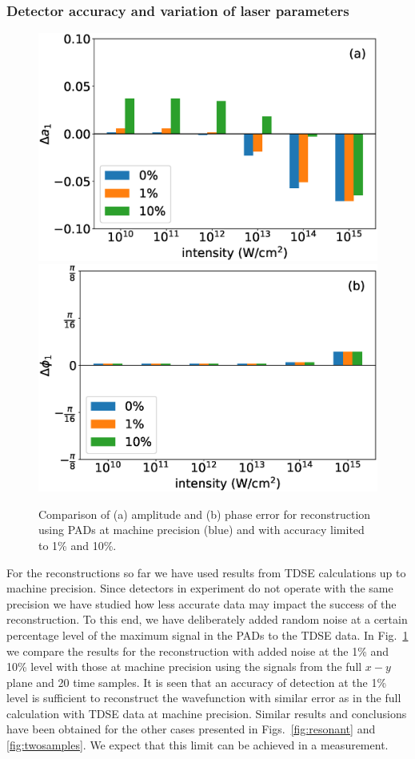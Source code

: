 \subsubsection{Detector accuracy and variation of laser parameters}

\begin{figure}[!ht]
\centering
\includegraphics[width=0.49\linewidth]{figs/Photo_ionization/superpositions/Venzke_new_fig_8a.eps}
\includegraphics[width=0.49\linewidth]{figs/Photo_ionization/superpositions/Venzke_new_fig_8b.eps}
\caption{
Comparison of (a) amplitude and (b) phase error for reconstruction using PADs at machine precision (blue) and with accuracy limited to 1\% and 10\%.
}
  \label{fig:detector}
\end{figure}

For the reconstructions so far
we have used results from TDSE calculations up to machine precision. Since detectors in experiment do not operate with the same precision we have studied how less accurate data may impact the success of the reconstruction. To this end, we have deliberately added random noise at a certain percentage level of the maximum signal in the PADs to the TDSE data. In Fig.\ \ref{fig:detector} we compare the results for the reconstruction with added noise at the  1\% and  10\% level with those at machine precision using the signals from the full $x-y$ plane and 20 time samples. It is seen that an accuracy of detection at the 1\% level is sufficient to reconstruct the wavefunction with similar error as in the full calculation with TDSE data at machine precision. Similar results and conclusions have been obtained for the other cases presented in Figs.\ \ref{fig:resonant} and \ref{fig:twosamples}. We expect that this limit can be achieved in a measurement.

